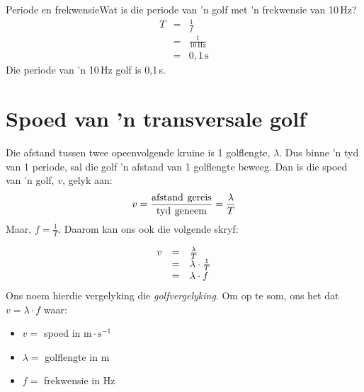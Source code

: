 \begin{definition}
\begin{wex}{Periode en frekwensie}{Wat is die periode van 'n golf met  'n frekwensie van 10\,Hz?}
{\begin{eqnarray*}
T&=&\frac{1}{f}\\
&=&\frac{1}{10\,\text{Hz}}\\
&=&0,1\,\text{s}
\end{eqnarray*}
Die periode van 'n 10\,Hz golf is 0,1\,s.}
\end{wex}

    \noindent
      \label{m38806*uid21}
            \section{Spoed van 'n transversale golf}
            \nopagebreak
   
        \label{m38806*id319706}Die afstand tussen twee opeenvolgende kruine is 1 golflengte, $\lambda $. Dus binne 'n tyd van 1
    periode, sal die golf  'n afstand van 1 golflengte beweeg. Dan is die spoed van  'n golf, $v$, gelyk aan:
        \label{m38806*id319732}\nopagebreak\noindent{}
    \begin{equation}\nonumber
    v=\frac{\text{afstand}\phantom{\rule{4.pt}{0ex}}\text{gereis}}{\text{tyd}\phantom{\rule{4.pt}{0ex}}\text{geneem}}=\frac{\lambda }{T}
      \end{equation}
        \label{m38806*id319776}Maar, $f=\frac{1}{T}$. Daarom kan ons ook die volgende skryf: 
        \label{m38806*id319802}\nopagebreak\noindent{}
          
    \begin{equation}\nonumber
    \begin{array}{ccc}\hfill v& =& \frac{\lambda }{T}\hfill \\ & =& \lambda \ensuremath{\cdot}\frac{1}{T}\hfill \\ & =& \lambda \ensuremath{\cdot}f\hfill \end{array}
      \end{equation}
        \label{m38806*id319870}Ons noem hierdie vergelyking die \textsl{golfvergelyking}. Om op te som, ons het dat $v=\lambda \ensuremath{\cdot}f$ waar: 
        \label{m38806*id319901}\begin{itemize}[noitemsep]
            \label{m38806*uid22}\item $v=$ spoed in $\text{m}\ensuremath{\cdot}\text{s}{}^{-1}$\label{m38806*uid23}\item $\lambda =$ golflengte in $\text{m}$
\label{m38806*uid24}\item $f=$ frekwensie in $\text{Hz}$
\end{itemize}


\end{definition}
